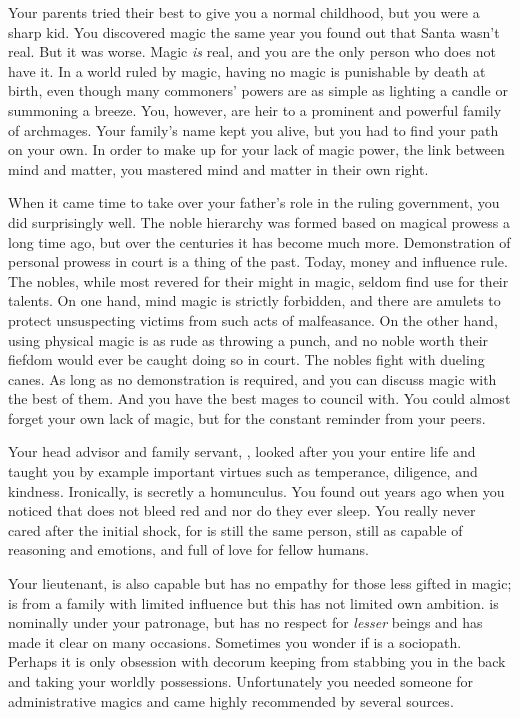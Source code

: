 \documentclass[char]{guildcamp3}
\begin{document}
\name{\cNobleOne{}}





Your parents tried their best to give you a normal childhood, but you were a sharp kid. You discovered magic the same year you found out that Santa wasn't real. But it was worse. Magic \emph{is} real, and you are the only person who does not have it. In a world ruled by magic, having no magic is punishable by death at birth, even though many commoners' powers are as simple as lighting a candle or summoning a breeze. You, however, are heir to a prominent and powerful family of archmages. Your family's name kept you alive, but you had to find your path on your own. In order to make up for your lack of magic power, the link between mind and matter, you mastered mind and matter in their own right.

When it came time to take over your father's role in the ruling government, you did surprisingly well. The noble hierarchy was formed based on magical prowess a long time ago, but over the centuries it has become much more. Demonstration of personal prowess in court is a thing of the past. Today, money and influence rule. The nobles, while most revered for their might in magic, seldom find use for their talents. On one hand, mind magic is strictly forbidden, and there are amulets to protect unsuspecting victims from such acts of malfeasance. On the other hand, using physical magic is as rude as throwing a punch, and no noble worth their fiefdom would ever be caught doing so in court. The nobles fight with dueling canes. As long as no demonstration is required, and you can discuss magic with the best of them. And you have the best mages to council with. You could almost forget your own lack of magic, but for the constant reminder from your peers.

Your head advisor and family servant, \cServant{\intro}, looked after you your entire life and taught you by example important virtues such as temperance, diligence, and kindness. Ironically,  is secretly a homunculus. You found out years ago when you noticed that  does not bleed red and nor do they ever sleep. You really never cared after the initial shock, for  is still the same person, still as capable of reasoning and emotions, and full of love for  fellow humans.

Your lieutenant, \cNobleTwo{\intro} is also capable but has no empathy for those less gifted in magic;  is from a family with limited influence but this has not limited  own ambition. \cNobleTwo{} is nominally under your patronage, but  has no respect for \emph{lesser} beings and has made it clear on many occasions. Sometimes you wonder if \cNobleTwo{} is a sociopath. Perhaps it is only  obsession with decorum keeping \cNobleTwo{\them} from stabbing you in the back and taking your worldly possessions. Unfortunately you needed someone for administrative magics and \cNobleTwo{} came highly recommended by several sources. 
\end{document}
